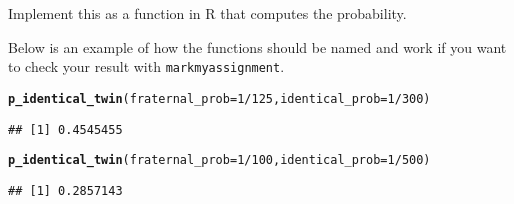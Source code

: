 \documentclass[11pt,a4paper,english]{article}\usepackage[]{graphicx}\usepackage[]{xcolor}
\makeatletter
\newcommand{\hlnum}[1]{\textcolor[rgb]{0.686,0.059,0.569}{#1}}%
\newcommand{\hlopt}[1]{\textcolor[rgb]{0,0,0}{#1}}%
\newcommand{\hlstd}[1]{\textcolor[rgb]{0.345,0.345,0.345}{#1}}%
\newcommand{\hlkwc}[1]{\textcolor[rgb]{0.333,0.667,0.333}{#1}}%
\newcommand{\hlkwd}[1]{\textcolor[rgb]{0.737,0.353,0.396}{\textbf{#1}}}%
\newenvironment{kframe}{%
 \def\at@end@of@kframe{}%
 \ifinner\ifhmode%
  \def\at@end@of@kframe{\end{minipage}}%
  \begin{minipage}{\columnwidth}%
 \fi\fi%
 \def\FrameCommand##1{\hskip\@totalleftmargin \hskip-\fboxsep
 \colorbox{shadecolor}{##1}\hskip-\fboxsep
     \hskip-\linewidth \hskip-\@totalleftmargin \hskip\columnwidth}%
 \MakeFramed {\advance\hsize-\width
   \@totalleftmargin\z@ \linewidth\hsize
   \@setminipage}}%
 {\par\unskip\endMakeFramed%
 \at@end@of@kframe}
\newenvironment{knitrout}{}{} %
\makeatother
\begin{document}
\begin{enumerate}
Implement this as a function in R that computes the probability.

Below is an example of how the functions should be named and work if you want to check your result with \texttt{markmyassignment}.



\begin{knitrout}\small
{}\color{fgcolor}\begin{kframe}
\begin{alltt}
\hlkwd{p_identical_twin}\hlstd{(}\hlkwc{fraternal_prob} \hlstd{=} \hlnum{1}\hlopt{/}\hlnum{125}\hlstd{,} \hlkwc{identical_prob} \hlstd{=} \hlnum{1}\hlopt{/}\hlnum{300}\hlstd{)}
\end{alltt}
\begin{verbatim}
## [1] 0.4545455
\end{verbatim}
\end{kframe}
\end{knitrout}



\begin{knitrout}\small
{}\color{fgcolor}\begin{kframe}
\begin{alltt}
\hlkwd{p_identical_twin}\hlstd{(}\hlkwc{fraternal_prob} \hlstd{=} \hlnum{1}\hlopt{/}\hlnum{100}\hlstd{,} \hlkwc{identical_prob} \hlstd{=} \hlnum{1}\hlopt{/}\hlnum{500}\hlstd{)}
\end{alltt}
\begin{verbatim}
## [1] 0.2857143
\end{verbatim}
\end{kframe}
\end{knitrout}

\end{enumerate}
\end{document}
